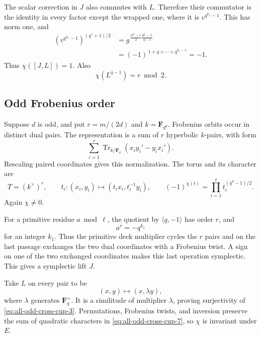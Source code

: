 The scalar correction in \(J\) also commutes with \(L\).
Therefore their commutator is the identity in every
factor except the wrapped one, where it is
\(v^{q^{k_1}-1}\).
This has norm one, and
\begin{equation}
 \begin{split}
 \left(v^{q^{k_1}-1}\right)^{(q^s+1)/2}
 &=g^{\,\frac{q^{2s}-1}{2}
                    \frac{q^{k_1}-1}{q-1}}\\
 &=(-1)^{\,1+q+\cdots+q^{k_1-1}}
 =-1 .
 \end{split}                                               \label{eq:all-odd-cross-cup-5}
\end{equation}
Thus \(\chi([J,L])=1\).
Also
\begin{equation}
                         \chi(L^{q-1})=r\bmod2.            \label{eq:all-odd-cross-cup-6}
\end{equation}

\subsection{Odd Frobenius order}

Suppose \(d\) is odd, and put \(r=m/(2d)\) and
\(k=\mathbf F_{q^d}\).
Frobenius orbits occur in distinct dual pairs.
The representation is a sum of \(r\) hyperbolic
\(k\)-pairs, with form
\[
 \sum_{i=1}^r
 \operatorname{Tr}_{k/\mathbf F_q}(x_i y_i'-y_i x_i').
\]
Rescaling paired coordinates gives this normalization.
The torus and its character are
\begin{equation}
 T=(k^\times)^r,\qquad
 t_i:(x_i,y_i)\mapsto(t_i x_i,t_i^{-1}y_i),\qquad
 (-1)^{\chi(t)}
      =\prod_{i=1}^r t_i^{(q^d-1)/2}.                     \label{eq:all-odd-cross-cup-7}
\end{equation}
Again \(\chi\ne0\).

For a primitive residue \(a\bmod\ell\), the quotient
by \(\langle q,-1\rangle\) has order \(r\), and
\[
                            a^r=-q^{k_1}
\]
for an integer \(k_1\).
Thus the primitive deck multiplier cycles the \(r\)
pairs and on the last passage exchanges the two
dual coordinates with a Frobenius twist.
A sign on one of the two exchanged coordinates
makes this last operation symplectic.
This gives a symplectic lift \(J\).

Take \(L\) on every pair to be
\[
                              (x,y)\mapsto(x,\lambda y),
\]
where \(\lambda\) generates \(\mathbf F_q^\times\).
It is a similitude of multiplier \(\lambda\), proving
surjectivity of \eqref{eq:all-odd-cross-cup-3}.
Permutations, Frobenius twists, and inversion preserve
the sum of quadratic characters in \eqref{eq:all-odd-cross-cup-7}, so \(\chi\)
is invariant under \(E\).

